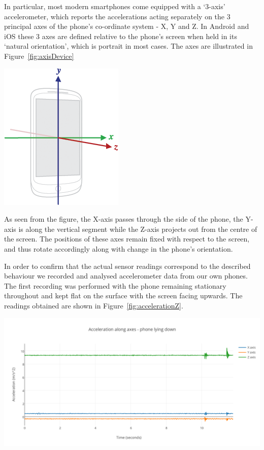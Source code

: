 \documentclass[main.tex]{subfiles}
\begin{document}
In particular, most modern smartphones come equipped with a `3-axis' accelerometer, which reports the accelerations acting separately on the 3 principal axes of the phone's co-ordinate system - X, Y and Z. In Android and iOS these 3 axes are defined relative to the phone's screen when held in its `natural orientation', which is portrait in most cases. The axes are illustrated in Figure~\ref{fig:axisDevice}

\begin{center}
\includegraphics[scale=0.5]{images/axisDevice.png}
\label{fig:axisDevice}
\end{center}

As seen from the figure, the X-axis passes through the side of the phone, the Y-axis is along the vertical segment while the Z-axis projects out from the centre of the screen. The positions of these axes remain fixed with respect to the screen, and thus rotate accordingly along with change in the phone's orientation. 

In order to confirm that the actual sensor readings correspond to the described behaviour we recorded and analysed accelerometer data from our own phones. The first recording was performed with the phone remaining stationary throughout and kept flat on the surface with the screen facing upwards. The readings obtained are shown in Figure~\ref{fig:accelerationZ}.

\begin{center}
\includegraphics[scale=0.9]{images/accelerationZ.png}
\label{fig:accelerationZ}
\end{center}
\end{document}
